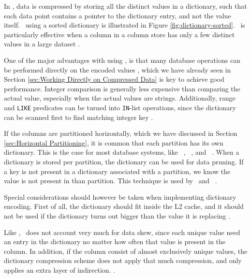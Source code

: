 In \de, data is compressed by storing all the distinct values in a dictionary, such that each data point contains a pointer to the dictionary entry, and not the value itself. \de~using a sorted dictionary is illustrated in Figure \ref{fig:dictionary-sorted}. \de~is particularly effective when a column in a column store has only a few distinct values in a large dataset \cite{Faust2015-ke}.

One of the major advantages with using \de, is that many database operations can be performed directly on the encoded values \cite{Faust2015-ke}, which we have already seen in Section \ref{sec:Working Directly on Compressed Data} is key to achieve good performance. Integer comparison is generally less expensive than comparing the actual value, especially when the actual values are strings. Additionally, range and \texttt{LIKE} predicates can be turned into \texttt{IN}-list operations, since the dictionary can be scanned first to find matching integer key \cite{Barber2012-xt}.

If the columns are partitioned horizontally, which we have discussed in Section \ref{sec:Horizontal Partitioning}, it is common that each partition has its own dictionary. This is the case for most database systems, like \oracle~\cite{Lahiri2015-mz}, \blink~\cite{Barber2012-xt}, and \mssql~\cite{Larson2013-mc}. When a dictionary is stored per partition, the dictionary can be used for data pruning. If a key is not present in a dictionary associated with a partition, we know the value is not present in than partition. This technique is used by \blink~and \monetx~\cite{Barber2012-xt, Boncz2012-xt}. 

Special considerations should however be taken when implementing dictionary encoding. First of all, the dictionary should fit inside the L2 cache, and it should not be used if the dictionary turns out bigger than the value it is replacing \cite{Holloway2008-rr}. 

Like \bp, \de~does not account very much for data skew, since each unique value need an entry in the dictionary no matter how often that value is present in the column. In addition, if the column consist of almost exclusively unique values, the dictionary compression scheme does not apply that much compression, and only applies an extra layer of indirection. .

